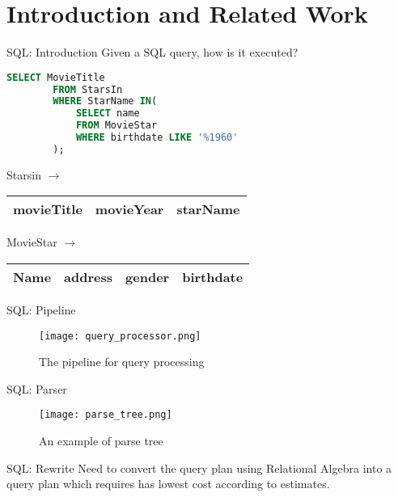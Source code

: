 \section{Introduction and Related Work}
\frame{\sectionpage}


\begin{frame}[fragile]{SQL: Introduction}
    Given a SQL query, how is it executed?
    \begin{lstlisting}[language=SQL, caption= SQL query to execute.]
        SELECT MovieTitle
        FROM StarsIn
        WHERE StarName IN(
            SELECT name
            FROM MovieStar
            WHERE birthdate LIKE '%1960'
        );
    \end{lstlisting}
    Starsin $\rightarrow$
    \begin{tabular}{ |c|c|c| } 
    \hline
    movieTitle & movieYear & starName\\ \hline
    \end{tabular}
    
    MovieStar $\rightarrow$
    \begin{tabular}{ |c|c|c|c| } 
    \hline
    Name & address & gender & birthdate\\ \hline
    \end{tabular}
    
\end{frame}

\begin{frame}{SQL: Pipeline}
    \begin{figure}
        \centering
        \texttt{[image: query\_processor.png]}\\
        \caption{The pipeline for query processing}
        \label{fig:query_processor}
    \end{figure}
\end{frame}

\begin{frame}{SQL: Parser}
    \begin{figure}
        \centering
        \texttt{[image: parse\_tree.png]}\\
        \caption{An example of parse tree}
        \label{fig:prase_tree}
    \end{figure}
\end{frame}

\begin{frame}{SQL: Rewrite}
    Need to convert the query plan using Relational Algebra into a query plan which requires has lowest cost according to estimates.
\end{frame}

